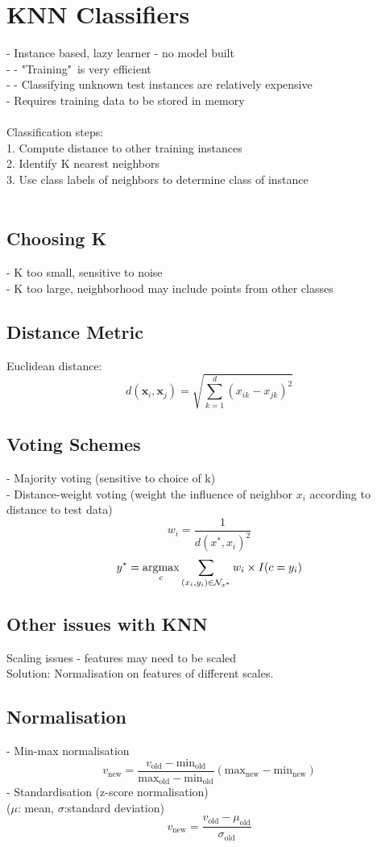 \section{KNN Classifiers}
- Instance based, lazy learner - no model built\\
- - "Training"\ is very efficient\\
- - Classifying unknown test instances are relatively expensive\\
- Requires training data to be stored in memory\\\\
Classification steps:\\
1. Compute distance to other training instances\\
2. Identify K nearest neighbors\\
3. Use class labels of neighbors to determine class of instance\\\\
\subsection*{Choosing K}
- K too small, sensitive to noise\\
- K too large, neighborhood may include points from other classes\\
\subsection*{Distance Metric}
Euclidean distance:\\
\[d(\mathbf{x}_i,\mathbf{x}_j) = \sqrt{\sum^{d}_{k=1}(x_{ik} - x_{jk})^2}\]
\subsection*{Voting Schemes}
- Majority voting (sensitive to choice of k)\\
- Distance-weight voting (weight the influence of neighbor $x_i$ according to distance to test data)\\
\[w_i = \frac{1}{d(x^*, x_i)^2}\]
\[y^* = \operatorname*{\arg\!\max}_c \sum_{(x_i, y_i)\in\mathcal{N}_{x^*}} w_i \times I(c = y_i) \]
\subsection*{Other issues with KNN}
Scaling issues - features may need to be scaled\\
Solution: Normalisation on features of different scales.
\subsection*{Normalisation}
- Min-max normalisation\\
\[v_{\text{new}} = \frac{v_{\text{old}}-\text{min}_{\text{old}}}{\text{max}_{\text{old}}-\text{min}_{\text{old}}}(\text{max}_{\text{new}}-\text{min}_{\text{new}}) \]
- Standardisation (z-score normalisation)\\
($\mu$: mean, $\sigma$:standard deviation)\\
\[v_{\text{new}} = \frac{v_{\text{old}} - \mu_{\text{old}}}{\sigma_{\text{old}}}\]
